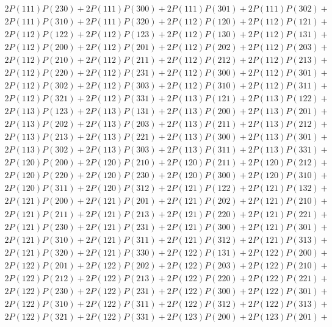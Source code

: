 \begin{align*}
	2P(111)P(230) + 2P(111)P(300) + 2P(111)P(301) + 2P(111)P(302)+ \\ 
	2P(111)P(310) + 2P(111)P(320) + 2P(112)P(120) + 2P(112)P(121)+ \\ 
	2P(112)P(122) + 2P(112)P(123) + 2P(112)P(130) + 2P(112)P(131)+ \\ 
	2P(112)P(200) + 2P(112)P(201) + 2P(112)P(202) + 2P(112)P(203)+ \\ 
	2P(112)P(210) + 2P(112)P(211) + 2P(112)P(212) + 2P(112)P(213)+ \\ 
	2P(112)P(220) + 2P(112)P(231) + 2P(112)P(300) + 2P(112)P(301)+ \\ 
	2P(112)P(302) + 2P(112)P(303) + 2P(112)P(310) + 2P(112)P(311)+ \\ 
	2P(112)P(321) + 2P(112)P(331) + 2P(113)P(121) + 2P(113)P(122)+ \\ 
	2P(113)P(123) + 2P(113)P(131) + 2P(113)P(200) + 2P(113)P(201)+ \\ 
	2P(113)P(202) + 2P(113)P(203) + 2P(113)P(211) + 2P(113)P(212)+ \\ 
	2P(113)P(213) + 2P(113)P(221) + 2P(113)P(300) + 2P(113)P(301)+ \\ 
	2P(113)P(302) + 2P(113)P(303) + 2P(113)P(311) + 2P(113)P(331)+ \\ 
	2P(120)P(200) + 2P(120)P(210) + 2P(120)P(211) + 2P(120)P(212)+ \\ 
	2P(120)P(220) + 2P(120)P(230) + 2P(120)P(300) + 2P(120)P(310)+ \\ 
	2P(120)P(311) + 2P(120)P(312) + 2P(121)P(122) + 2P(121)P(132)+ \\ 
	2P(121)P(200) + 2P(121)P(201) + 2P(121)P(202) + 2P(121)P(210)+ \\ 
	2P(121)P(211) + 2P(121)P(213) + 2P(121)P(220) + 2P(121)P(221)+ \\ 
	2P(121)P(230) + 2P(121)P(231) + 2P(121)P(300) + 2P(121)P(301)+ \\ 
	2P(121)P(310) + 2P(121)P(311) + 2P(121)P(312) + 2P(121)P(313)+ \\ 
	2P(121)P(320) + 2P(121)P(330) + 2P(122)P(131) + 2P(122)P(200)+ \\ 
	2P(122)P(201) + 2P(122)P(202) + 2P(122)P(203) + 2P(122)P(210)+ \\ 
	2P(122)P(212) + 2P(122)P(213) + 2P(122)P(220) + 2P(122)P(221)+ \\ 
	2P(122)P(230) + 2P(122)P(231) + 2P(122)P(300) + 2P(122)P(301)+ \\ 
	2P(122)P(310) + 2P(122)P(311) + 2P(122)P(312) + 2P(122)P(313)+ \\ 
	2P(122)P(321) + 2P(122)P(331) + 2P(123)P(200) + 2P(123)P(201)+ \\ 

\end{align*}
